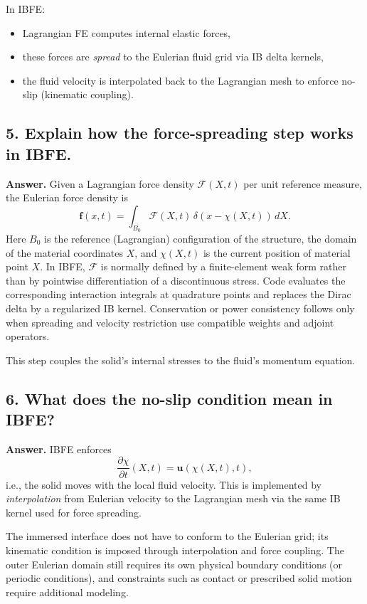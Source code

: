 \documentclass[12pt]{article}
\begin{document}
In IBFE:
\begin{itemize}
    \item Lagrangian FE computes internal elastic forces,
    \item these forces are \emph{spread} to the Eulerian fluid grid via IB
          delta kernels,
    \item the fluid velocity is interpolated back to the Lagrangian mesh to
          enforce no-slip (kinematic coupling).
\end{itemize}

\subsection*{5. Explain how the force-spreading step works in IBFE.}

\textbf{Answer.}
Given a Lagrangian force density $\boldsymbol{\mathcal F}(X,t)$ per unit reference measure,
the Eulerian force density is
\[
\mathbf{f}(x,t) = \int_{B_0}
\boldsymbol{\mathcal F}(X,t)\,\delta(x - \chi(X,t))\,dX.
\]
Here $B_0$ is the reference (Lagrangian) configuration of the structure, the domain of the material coordinates $X$, and $\chi(X,t)$ is the current position of material point $X$.
In IBFE, $\boldsymbol{\mathcal F}$ is normally defined by a finite-element weak form rather than by pointwise differentiation of a discontinuous stress. Code evaluates the corresponding interaction integrals at quadrature points and replaces the Dirac delta by a regularized IB kernel. Conservation or power consistency follows only when spreading and velocity restriction use compatible weights and adjoint operators.

This step couples the solid’s internal stresses to the fluid’s momentum
equation.

\subsection*{6. What does the no-slip condition mean in IBFE?}

\textbf{Answer.}
IBFE enforces
\[
\frac{\partial \chi}{\partial t}(X,t) = \mathbf{u}(\chi(X,t),t),
\]
i.e.,
the solid moves with the local fluid velocity.
This is implemented by \emph{interpolation} from Eulerian velocity to the
Lagrangian mesh via the same IB kernel used for force spreading.

The immersed interface does not have to conform to the Eulerian grid; its kinematic condition is imposed through interpolation and force coupling. The outer Eulerian domain still requires its own physical boundary conditions (or periodic conditions), and constraints such as contact or prescribed solid motion require additional modeling.
\end{document}
